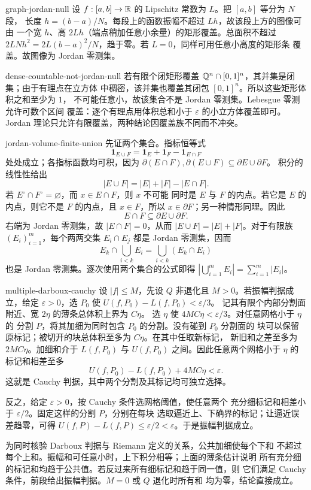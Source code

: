 \begin{solution}{graph-jordan-null}
设 $f:[a,b]\to\mathbb{R}$ 的 Lipschitz 常数为 $L$。把 $[a,b]$ 等分为 $N$ 段，
长度 $h=(b-a)/N$。每段上的函数振幅不超过 $Lh$，故该段上方的图像可由
一个宽 $h$、高 $2Lh$（端点稍加任意小余量）的矩形覆盖。总面积不超过
$2LN h^2=2L(b-a)^2/N$，趋于零。若 $L=0$，同样可用任意小高度的矩形条
覆盖。故图像为 Jordan 零测集。
\end{solution}

\begin{solution}{dense-countable-not-jordan-null}
若有限个闭矩形覆盖 $\mathbb{Q}^n\cap[0,1]^n$，其并集是闭集；由于有理点在立方体
中稠密，该并集也覆盖其闭包 $[0,1]^n$。所以这些矩形体积之和至少为 $1$，
不可能任意小，故该集合不是 Jordan 零测集。Lebesgue 零测允许可数个区间
覆盖：逐个有理点用体积总和小于 $\varepsilon$ 的小立方体覆盖即可。Jordan
理论只允许有限覆盖，两种结论因覆盖族不同而不冲突。
\end{solution}

\begin{solution}{jordan-volume-finite-union}
先证两个集合。指标恒等式
\[
 \mathbf1_{E\cup F}=\mathbf1_E+\mathbf1_F-\mathbf1_{E\cap F}
\]
处处成立；各指标函数均可积，因为
$\partial(E\cap F),\partial(E\cup F)\subseteq\partial E\cup\partial F$。
积分的线性性给出
\[
 |E\cup F|=|E|+|F|-|E\cap F|.
\]
若 $E^\circ\cap F^\circ=\varnothing$，而 $x\in E\cap F$，则 $x$ 不可能
同时是 $E$ 与 $F$ 的内点。若它是 $E$ 的内点，则它不是 $F$ 的内点，且
$x\in F$，所以 $x\in\partial F$；另一种情形同理。因此
\[
 E\cap F\subseteq\partial E\cup\partial F.
\]
右端为 Jordan 零测集，故 $|E\cap F|=0$，从而
$|E\cup F|=|E|+|F|$。对于有限族 $(E_i)_{i=1}^m$，每个两两交集
$E_i\cap E_j$ 都是 Jordan 零测集，因而
\[
 E_k\cap\bigcup_{i<k}E_i=\bigcup_{i<k}(E_k\cap E_i)
\]
也是 Jordan 零测集。逐次使用两个集合的公式即得
$|\bigcup_{i=1}^mE_i|=\sum_{i=1}^m|E_i|$。
\end{solution}

\begin{solution}{multiple-darboux-cauchy}
设 $|f|\le M$，先设 $Q$ 非退化且 $M>0$。若振幅判据成立，给定
$\varepsilon>0$，选 $P_0$ 使 $U(f,P_0)-L(f,P_0)<\varepsilon/3$。
记其有限个内部分割面附近、宽 $2\eta$ 的薄条总体积上界为 $C\eta$。
选 $\eta$ 使 $4MC\eta<\varepsilon/3$。对任意网格小于 $\eta$ 的
分割 $P$，将其加细为同时包含 $P_0$ 的分割。没有碰到 $P_0$ 分割面的
块可以保留原标记；被切开的块总体积至多为 $C\eta$。在其中任取新标记，
新旧和之差至多为 $2MC\eta$。加细和介于 $L(f,P_0)$ 与 $U(f,P_0)$
之间。因此任意两个网格小于 $\eta$ 的标记和相差至多
\[
 U(f,P_0)-L(f,P_0)+4MC\eta<\varepsilon.
\]
这就是 Cauchy 判据，其中两个分割及其标记均可独立选择。

反之，给定 $\varepsilon>0$，按 Cauchy 条件选网格阈值，使任意两个
充分细标记和相差小于 $\varepsilon/2$。固定这样的分割 $P$，分别在每块
选取逼近上、下确界的标记；让逼近误差趋零，可得
$U(f,P)-L(f,P)\le\varepsilon/2<\varepsilon$。于是振幅判据成立。

为同时核验 Darboux 判据与 Riemann 定义的关系，公共加细使每个下和
不超过每个上和。振幅和可任意小时，上下积分相等；上面的薄条估计说明
所有充分细的标记和均趋于公共值。若反过来所有细标记和趋于同一值，则
它们满足 Cauchy 条件，前段给出振幅判据。$M=0$ 或 $Q$ 退化时所有和
均为零，结论直接成立。
\end{solution}

